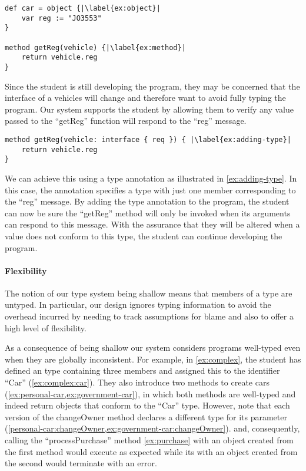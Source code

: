 \begin{lstlisting}[caption={The start of a simple program for tracking vehicle information.},escapechar=|]
def car = object {|\label{ex:object}|
    var reg := "JO3553"
}

method getReg(vehicle) {|\label{ex:method}|
    return vehicle.reg
}
\end{lstlisting}

Since the student is still developing the program, 
they may be concerned that the interface of a vehicles will change 
and therefore want to avoid fully typing the program.
Our system supports the student by allowing them to verify
any value passed to the ``getReg'' function will respond
to the ``reg'' message. 


\begin{lstlisting}[caption={Adding a type annotation to a method parameter.},escapechar=|]
method getReg(vehicle: interface { req }) { |\label{ex:adding-type}|
    return vehicle.reg
}
\end{lstlisting}

We can achieve this using a type annotation 
as illustrated in \cref{ex:adding-type}. 
In this case, 
the annotation specifies a type with just one member
corresponding to the ``reg'' message.
By adding the type annotation to the program, 
the student can now be sure the ``getReg'' method
will only be invoked when its arguments can respond to this message.
With the assurance that they will be altered when a value 
does not conform to this type,
the student can continue developing the program.

\paragraph{Flexibility}

The notion of our type system being shallow means 
that members of a type are untyped.
In particular, our design ignores typing information
to avoid the overhead incurred by needing to track assumptions for blame and
also to offer a high level of flexibility.

As a consequence of being shallow our system considers programs
well-typed even when they are globally inconsistent.
For example, in \cref{ex:complex}, the student has defined an type containing
three members and assigned this to the identifier ``Car'' (\cref{ex:complex:car}).
They also introduce two methods to create cars 
(\cref{ex:personal-car,ex:government-car}),
in which both methods are well-typed and indeed return objects that conform to
the ``Car'' type.
However, note that each version of the changeOwner method
declares a different type for its parameter
(\cref{personal-car:changeOwner,ex:government-car:changeOwner}).
and, consequently, calling the 
``processPurchase'' method \cref{ex:purchase} with
an object created from the first method would execute as expected
while its with an object created from the second would terminate with
an error. 

